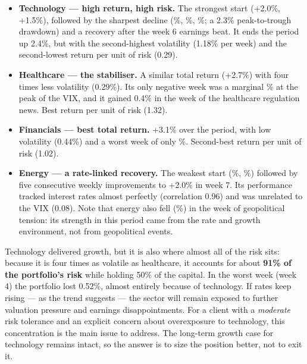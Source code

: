 \documentclass[11pt]{article}
\begin{document}
\begin{itemize}[leftmargin=1.5em, itemsep=2pt]
  \item \textbf{Technology --- high return, high risk.} The strongest start
  (+2.0\%, +1.5\%), followed by the sharpest decline (\%, \%,
  \%; a 2.3\% peak-to-trough drawdown) and a recovery after the week 6
  earnings beat. It ends the period up 2.4\%, but with the second-highest
  volatility (1.18\% per week) and the second-lowest return per unit of risk
  (0.29).
  \item \textbf{Healthcare --- the stabiliser.} A similar total return (+2.7\%)
  with four times less volatility (0.29\%). Its only negative week was a
  marginal \% at the peak of the VIX, and it gained 0.4\% in the week of
  the healthcare regulation news. Best return per unit of risk (1.32).
  \item \textbf{Financials --- best total return.} +3.1\% over the period, with
  low volatility (0.44\%) and a worst week of only \%. Second-best return
  per unit of risk (1.02).
  \item \textbf{Energy --- a rate-linked recovery.} The weakest start (\%,
  \%) followed by five consecutive weekly improvements to +2.0\% in week 7. Its
  performance tracked interest rates almost perfectly (correlation 0.96) and
  was unrelated to the VIX (0.08). Note that energy also fell (\%) in the
  week of geopolitical tension: its strength in this period came from the rate
  and growth environment, not from geopolitical events.
\end{itemize}


Technology delivered growth, but it is also where almost all of the risk sits:
because it is four times as volatile as healthcare, it accounts for about
\textbf{91\% of the portfolio's risk} while holding 50\% of the capital. In the
worst week (week 4) the portfolio lost 0.52\%, almost entirely because of
technology. If rates keep rising --- as the trend suggests --- the sector will
remain exposed to further valuation pressure and earnings disappointments. For
a client with a \emph{moderate} risk tolerance and an explicit concern about
overexposure to technology, this concentration is the main issue to address.
The long-term growth case for technology remains intact, so the answer is to
size the position better, not to exit it.
\end{document}
